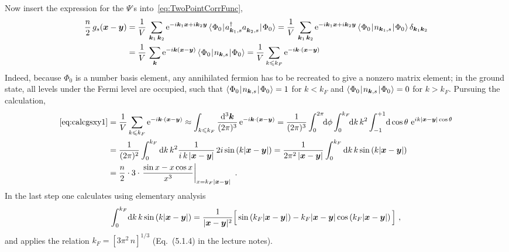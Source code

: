 \documentclass[11pt,a4paper]{article}
\newcommand{\ee}{{\mathrm{e}}}
\newcommand{\abs}[1]{\lvert#1\rvert}
\newcommand{\matrixel}[3]{\langle\hspace{0.15mm}#1\hspace{0.25mm}\vert\hspace{0.25mm} #2
  \hspace{0.25mm}\vert\hspace{0.25mm}#3\hspace{0.15mm}\rangle}
\newcommand{\boldx}{{\boldsymbol x}}
\newcommand{\boldy}{{\boldsymbol y}}
\newcommand{\boldk}{{\boldsymbol k}}
\begin{document}
\begin{exenumerate}
\begin{loesung}
    Now insert the expression for the $\Psi$'s into~\eqref{eq:TwoPointCorrFunc},
    \begin{align}
      \frac{n}{2}\,g_s(\boldx-\boldy)
      &= \frac{1}{V}\,\sum_{\boldk_1\,\boldk_2} \ee^{-i\boldk_1\boldx + i\boldk_2\boldy} \,
      \matrixel{\Phi_0}{a^\dagger_{\boldk_1,s} a^{\vphantom{\dagger}}_{\boldk_2,s}}{\Phi_0}
      = \frac{1}{V}\,\sum_{\boldk_1\,\boldk_2} \ee^{-i\boldk_1\boldx + i\boldk_2\boldy} \,
      \matrixel{\Phi_0}{n_{\boldk_1,s}}{\Phi_0}\,\delta_{\boldk_1\boldk_2}\nonumber\\
      &= \frac{1}{V}\,\sum_{\boldk} \ee^{-i\boldk\left(\boldx-\boldy\right)} \,
      \matrixel{\Phi_0}{n_{\boldk,s}}{\Phi_0}
      = \frac{1}{V} \sum_{k\leqslant k_F} \ee^{-i\boldk\cdot\left(\boldx-\boldy\right)}
      \label{eq:calcgsxy1}
    \end{align}
    Indeed, because $\Phi_0$ is a number basis element, any annihilated fermion has to be recreated to give a nonzero
    matrix element; in the ground state, all levels under the Fermi level are occupied, such that
    $\matrixel{\Phi_0}{n_{\boldk,s}}{\Phi_0}=1$ for $k<k_F$ and $\matrixel{\Phi_0}{n_{\boldk,s}}{\Phi_0}=0$
    for $k>k_F$. Pursuing the calculation,
    \begin{align}
      \text{\eqref{eq:calcgsxy1}} &= \frac{1}{V} \sum_{k\leqslant k_F} \ee^{-i\boldk\cdot\left(\boldx-\boldy\right)}
      \approx
      \int_{k\leqslant k_F} \frac{\mathrm{d}^3\boldk}{(2\pi)^3}\,\ee^{-i\boldk\cdot\left(\boldx-\boldy\right)}
      = \frac{1}{(2\pi)^3} \int_0^{2\pi}\!\!\mathrm d\phi\int_0^{k_F}\!\! \mathrm d k\, k^2
      \int_{-1}^{+1}\! \mathrm d\cos\theta\,\,\ee^{i k \abs{\boldx-\boldy}\cos\theta} \nonumber\\
      &= \frac{1}{(2\pi)^2} \int_0^{k_F} \mathrm d k\,k^2 \frac1{i\,k\,\abs{\boldx-\boldy}}
      \,2i\sin\left(k\abs{\boldx-\boldy}\right)
      = \frac{1}{2\pi^2\,\abs{\boldx-\boldy}} \int_0^{k_F} \mathrm d k\,k \sin\left(k\abs{\boldx-\boldy}\right)
      \nonumber\\
      &= \frac{n}{2}\cdot 3\cdot \left.\frac{\sin x - x\cos x}{x^3}\right\rvert_{x=k_F\abs{\boldx-\boldy}}\ .
    \end{align}
    In the last step one calculates using elementary analysis
    \begin{align}
      \int_0^{k_F}\!\mathrm d k\,k\sin\left(k\abs{\boldx-\boldy}\right)
      = \frac{1}{\abs{\boldx-\boldy}^2}\Bigl[\,\sin\left(k_F \abs{\boldx-\boldy}\right)
        - k_F \abs{\boldx-\boldy} \cos\left(k_F\abs{\boldx-\boldy}\right) \,\Bigr]\ ,
    \end{align}
    and applies the relation $k_F=\left[3\pi^2\,n\right]^{1/3}$ (Eq.~(5.1.4) in the lecture notes).


\end{loesung}
\end{exenumerate}
\end{document}

